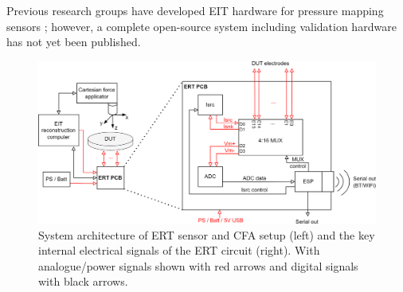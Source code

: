 Previous research groups have developed EIT hardware for pressure mapping sensors \cite{Chen2023,Zhang2017b,Visentin2016,Yoon2017,Sun2020}; however, a complete open-source system including validation hardware has not yet been published. 


\begin{figure}[H]
\centering
\includegraphics[width=\linewidth]{Figures/ERT_PCB_and_CFA_system.png}
\caption{System architecture of ERT sensor and CFA setup (left) and the key internal electrical signals of the ERT circuit (right). With analogue/power signals shown with red arrows and digital signals with black arrows.}
\label{fig:ERT_PCB_CFA_archit_full}
\end{figure}


